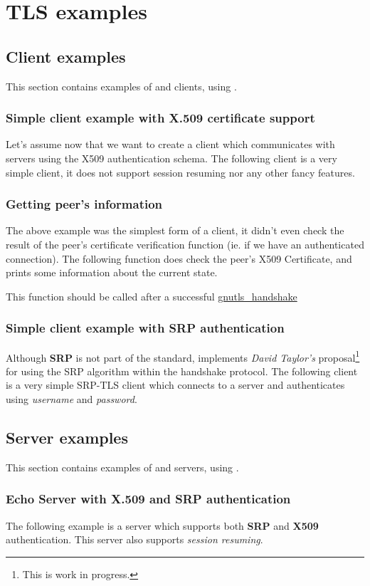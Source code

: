 \chapter{TLS examples}
\section{Client examples}
This section contains examples of \tls{} and \ssl{} clients, using \gnutls{}. 

\subsection{Simple client example with X.509 certificate support}
Let's assume now that we want to create a client which communicates
with servers using the X509 authentication schema. The following client
is a very simple \tls{} client, it does not support session resuming nor
any other fancy features.


\subsection{Getting peer's information}
\par The above example was the simplest form of a client, it didn't even check
the result of the peer's certificate verification function (ie. if we have
an authenticated connection). The following function does check the peer's X509
Certificate, and prints some information about the current state.
\par
This function should be called after a successful
\hyperref{gnutls\_handshake()}{gnutls\_handshake() (see Section }{)}{gnutls_handshake}





\subsection{Simple client example with SRP authentication}
Although {\bf SRP} is not part of the \tls{} standard, \gnutls{} implements
{\it David Taylor's} proposal\footnote{This is work in progress.}  for using the SRP algorithm
within the \tls{} handshake protocol. The following client
is a very simple SRP-TLS client which connects to a server 
and authenticates using {\it username} and {\it password}.



\section{Server examples}
This section contains examples of \tls{} and \ssl{} servers, using \gnutls{}.

\subsection{Echo Server with X.509 and SRP authentication}
The following example is a server which supports both {\bf SRP} and {\bf X509} authentication.
This server also supports {\it session resuming}.

